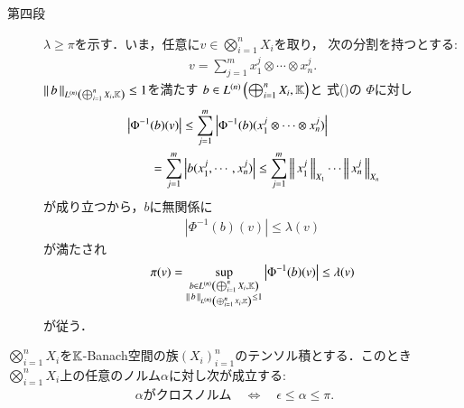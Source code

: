 \begin{prf}
\begin{description}
			\item[第四段]
				$\lambda \geq \pi$を示す．いま，任意に$v \in \bigotimes_{i=1}^n X_i$を取り，
				次の分割を持つとする:
				\begin{align}
					v = \sum_{j=1}^{m} x^j_1 \otimes \cdots \otimes x^j_n.
				\end{align}
				$\Norm{b}{\ContLn{\bigoplus_{i=1}^n X_i}{\K}{n}} \leq 1$を満たす
				$b \in \ContLn{\bigoplus_{i=1}^n X_i}{\K}{n}$と
				式()の
				$\Phi$に対し
				\begin{align}
					&\left| \Phi^{-1}(b)(v) \right|
					\leq \sum_{j=1}^{m} \left| \Phi^{-1}(b)(x^j_1 \otimes \cdots \otimes x^j_n) \right| \\
					&\qquad = \sum_{j=1}^{m} \left| b(x^j_1,\cdots,x^j_n) \right|
					\leq \sum_{j=1}^{m} \Norm{x^j_1}{X_1} \cdots \Norm{x^j_n}{X_n}
				\end{align}
				が成り立つから，$b$に無関係に
				\begin{align}
					\left| \Phi^{-1}(b)(v) \right| \leq \lambda(v)
				\end{align}
				が満たされ
				\begin{align}
					\pi(v) = \sup{\substack{b \in \ContLn{\bigoplus_{i=1}^n X_i}{\K}{n} \\ \Norm{b}{\ContLn{\bigoplus_{i=1}^n X_i}{\K}{n}} \leq 1}}{\left| \Phi^{-1}(b)(v) \right|}
					\leq \lambda(v)
				\end{align}
				が従う．
				\QED
		\end{description}
	\end{prf}
	
	\begin{screen}
		\begin{thm}
			$\bigotimes_{i=1}^n X_i$を$\K$-Banach空間の族$(X_i)_{i=1}^n$のテンソル積とする．このとき
			$\bigotimes_{i=1}^n X_i$上の任意のノルム$\alpha$に対し次が成立する:
			\begin{align}
				\mbox{$\alpha$がクロスノルム}
				\quad \Leftrightarrow \quad 
				\epsilon \leq \alpha \leq \pi.
			\end{align}
		\end{thm}
	\end{screen}
	
